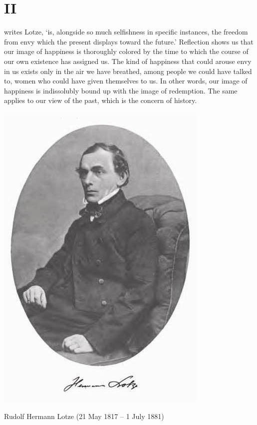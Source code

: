 \documentclass[12pt]{tufte-handout}
\begin{document}
\section{II}

 writes Lotze, `is, alongside so much selfishness in specific instances, the freedom from envy which the present displays toward the future.' Reflection shows us that our image of happiness is thoroughly colored by the time to which the course of our own existence has assigned us. The kind of happiness that could arouse envy in us exists only in the air we have breathed, among people we could have talked to, women who could have given themselves to us. In other words, our image of happiness is indissolubly bound up with the image of redemption. The same applies to our view of the past, which is the concern of history. \begin{marginfigure}%
  \includegraphics[width=\linewidth]{graphics/Lotze_Falckenberg1901.jpg}
  \caption{Rudolf Hermann Lotze (21 May 1817 – 1 July 1881)}
  \label{fig:Lotze}
\end{marginfigure}
\end{document}
